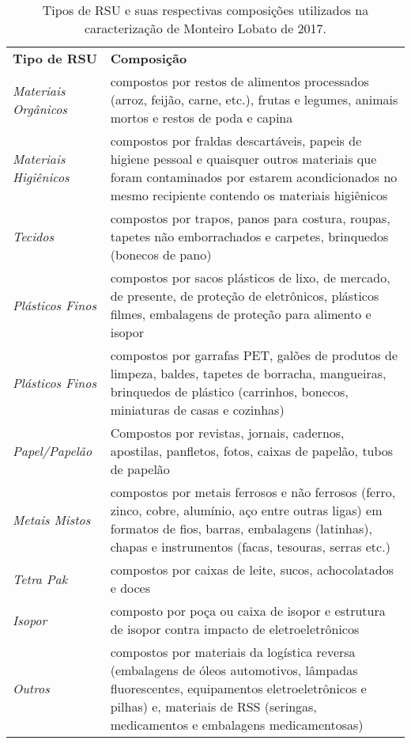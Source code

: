 \begin{table}[htbp]
  \centering
  \caption{Tipos de RSU e suas respectivas composições utilizados na caracterização de Monteiro Lobato de 2017.}
    \begin{tabular}{p{11.07em}p{26.93em}}
    \rowcolor[rgb]{ .969,  .588,  .275} \textbf{Tipo de RSU} & \textbf{Composição} \\
    \rowcolor[rgb]{ .992,  .914,  .851} \textit{Materiais Orgânicos} & compostos por restos de alimentos processados (arroz, feijão, carne, etc.), frutas e legumes, animais mortos e restos de poda e capina \\
    \rowcolor[rgb]{ .984,  .831,  .706} \textit{Materiais Higiênicos} & compostos por fraldas descartáveis, papeis de higiene pessoal e quaisquer outros materiais que foram contaminados por estarem acondicionados no mesmo recipiente contendo os materiais higiênicos \\
    \rowcolor[rgb]{ .992,  .914,  .851} \textit{Tecidos} & compostos por trapos, panos para costura, roupas, tapetes não emborrachados e carpetes, brinquedos (bonecos de pano) \\
    \rowcolor[rgb]{ .984,  .831,  .706} \textit{Plásticos Finos} & compostos por sacos plásticos de lixo, de mercado, de presente, de proteção de eletrônicos, plásticos filmes, embalagens de proteção para alimento e isopor \\
    \rowcolor[rgb]{ .992,  .914,  .851} \textit{Plásticos Finos} & compostos por garrafas PET, galões de produtos de limpeza, baldes, tapetes de borracha, mangueiras, brinquedos de plástico (carrinhos, bonecos, miniaturas de casas e cozinhas) \\
    \rowcolor[rgb]{ .984,  .831,  .706} \textit{Papel/Papelão} & Compostos por revistas, jornais, cadernos, apostilas, panfletos, fotos, caixas de papelão, tubos de papelão \\
    \rowcolor[rgb]{ .992,  .914,  .851} \textit{Metais Mistos} & compostos por metais ferrosos e não ferrosos (ferro, zinco, cobre, alumínio, aço entre outras ligas) em formatos de fios, barras, embalagens (latinhas), chapas e instrumentos (facas, tesouras, serras etc.) \\
    \rowcolor[rgb]{ .984,  .831,  .706} \textit{Tetra Pak} & compostos por caixas de leite, sucos, achocolatados e doces \\
    \rowcolor[rgb]{ .992,  .914,  .851} \textit{Isopor} & composto por poça ou caixa de isopor e estrutura de isopor contra impacto de eletroeletrônicos \\
    \rowcolor[rgb]{ .984,  .831,  .706} \textit{Outros} & compostos por materiais da logística reversa (embalagens de óleos automotivos, lâmpadas fluorescentes, equipamentos eletroeletrônicos e pilhas) e, materiais de RSS (seringas, medicamentos e embalagens medicamentosas) \\
    \end{tabular}%
  \label{tab:tipo_rsu_ml}%
\end{table}%
